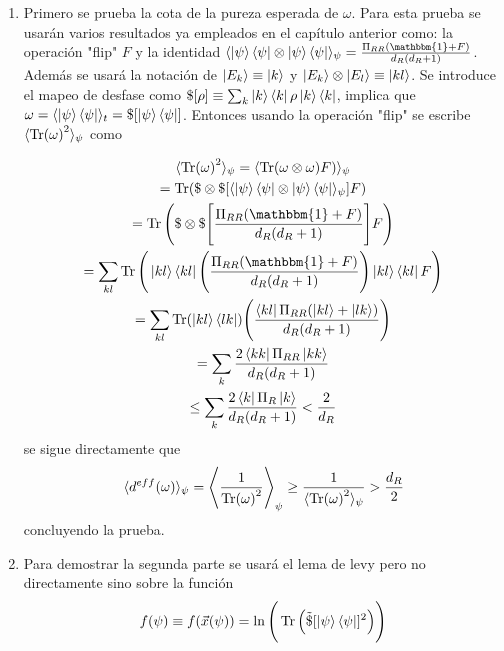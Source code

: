 \begin{enumerate}
\item
Primero se prueba la cota de la pureza esperada de $\omega$. Para esta prueba se usarán varios resultados ya empleados en el capítulo anterior como: la operación "flip"  $F$ y la identidad $\langle \ket{\psi} \bra{\psi} \otimes \ket{\psi} \bra{\psi} \rangle_{\psi} =  \frac{\Pi_{RR}(\mathbbm{1}+F)}{d_{R}(d_{R}+1)}$. Además se usará la notación de $ \ket{E_{k}} \equiv \ket{k}$ y $\ket{E_{k}} \otimes \ket{E_{l}} \equiv \ket{kl}$. Se introduce el mapeo de desfase como $ \$[ \rho ] \equiv  \sum_{k} \ket{k} \bra{k} \rho \ket{k}\bra{k}$, implica que $\omega= \langle \ket{\psi}\bra{\psi} \rangle_{t}= \$ [\ket{\psi}\bra{\psi}]$. Entonces usando la operación "flip"  se escribe $\langle \Tr (\omega)^{2} \rangle_{\psi}$ como
 
\begin{multline}
\langle \Tr (\omega)^{2} \rangle_{\psi} = \langle \Tr(\omega \otimes \omega)F) \rangle_{\psi}\\
= \Tr(\$ \otimes \$ [ \langle \ket{\psi} \bra{\psi} \otimes \ket{\psi} \bra{\psi} \rangle_{\psi}]F)\\
=\Tr \Bigg( \$ \otimes \$ \Bigg[ \frac{\Pi_{RR}(\mathbbm{1}+F)}{d_{R}(d_{R}+1)} \Bigg]F \Bigg)\\
= \sum_{kl} \Tr \Bigg(  \ket{kl}\bra{kl}  \Bigg(  \frac{\Pi_{RR}(\mathbbm{1}+F)}{d_{R}(d_{R}+1)} \Bigg) \ket{kl}\bra{kl} F \Bigg)\\
=\sum_{kl} \Tr ( \ket{kl}\bra{lk} ) \Bigg( \frac{\bra{kl} \Pi_{RR}(\ket{kl}+\ket{lk})}{d_{R}(d_{R}+1)}  \Bigg)\\
=\sum_{k} \frac{2 \bra{kk} \Pi_{RR}\ket{kk}}{d_{R}(d_{R}+1)} \\
\leq \sum_{k} \frac{2 \bra{k} \Pi_{R}\ket{k}}{d_{R}(d_{R}+1)} < \frac{2}{d_{R}}
\end{multline}
se sigue directamente que 
\begin{equation}
\langle d^{eff}(\omega) \rangle_{\psi} = \Bigg \langle \frac{1}{\Tr (\omega)^{2}} \Bigg \rangle_{\psi} \geq \frac{1}{\langle \Tr (\omega)^{2} \rangle_{\psi}} > \frac{d_{R}}{2}
\end{equation}
concluyendo la prueba.
\item
Para demostrar la segunda parte se usará el lema de levy \cite{lema} pero no directamente sino sobre la función 
\begin{equation}
f(\psi) \equiv f(\vec{x}(\psi)) = \ln \Bigg( \Tr \Big( \tilde{\$}[ \ket{\psi}\bra{\psi}]^{2} \Big) \Bigg)
\end{equation}


\end{enumerate}

